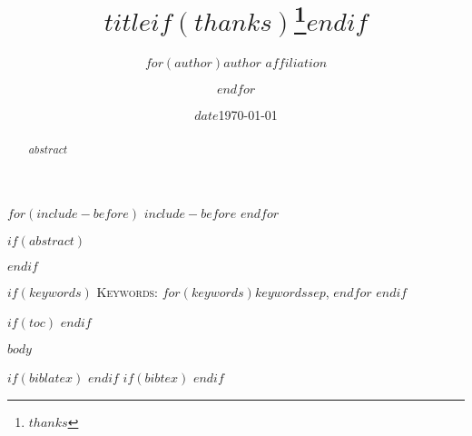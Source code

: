 \documentclass[$if(classoption)$$for(classoption)$$classoption$$sep$,$endfor$$if(biblatex)$,bibengine=biblatex$endif$$if(bibtex)$,bibengine=bibtex$endif$$endif$]{grlatex}
\title{$title$$if(thanks)$\thanks{$thanks$}$endif$}
\author{$for(author)$$author$ $affiliation$ \and $endfor$}
\date{$date$}
\date{\today}
\begin{document}
$for(include-before)$
$include-before$
$endfor$
\maketitle

$if(abstract)$
\begin{abstract}
$abstract$
\end{abstract}
$endif$


$if(keywords)$\vspace{0.5em}
\noindent\textsc{Keywords:} $for(keywords)$$keywords$$sep$, $endfor$
$endif$

\clearpage

$if(toc)$
	\tableofcontents
$endif$

$body$

$if(biblatex)$
	\printbibliography
$endif$
$if(bibtex)$
$endif$
\end{document}
